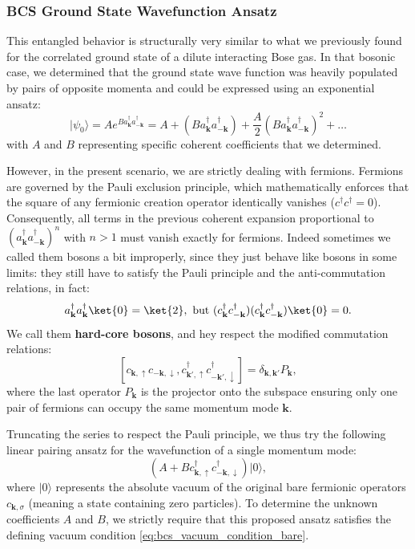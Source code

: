 \subsubsection{BCS Ground State Wavefunction Ansatz}

This entangled behavior is structurally very similar to what we previously found for the correlated ground state of a dilute interacting Bose gas. In that bosonic case, we determined that the ground state wave function was heavily populated by pairs of opposite momenta and could be expressed using an exponential ansatz:
\[
    |\psi_0\rangle = A e^{B a_{\mathbf{k}}^\dagger a_{-\mathbf{k}}^\dagger} = A + \left(B a_{\mathbf{k}}^\dagger a_{-\mathbf{k}}^\dagger\right) + \frac{A}{2} \left(B a_{\mathbf{k}}^\dagger a_{-\mathbf{k}}^\dagger\right)^2 + \dots
\]
with \( A \) and \( B \) representing specific coherent coefficients that we determined.

However, in the present scenario, we are strictly dealing with fermions. Fermions are governed by the Pauli exclusion principle, which mathematically enforces that the square of any fermionic creation operator identically vanishes (\( c^\dagger c^\dagger = 0 \)). Consequently, all terms in the previous coherent expansion proportional to \( \left(a_{\mathbf{k}}^\dagger a_{-\mathbf{k}}^\dagger\right)^n \) with \( n > 1 \) must vanish exactly for fermions. Indeed sometimes we called them bosons a bit improperly, since they just behave like bosons in some limits: they still have to satisfy the Pauli principle and the anti-commutation relations, in fact:
\[
    a^\dagger_{\mathbf{k}} a^\dagger_{\mathbf{k}} \ket{0} = \ket{2}, \text{ but } (c^\dagger_{\mathbf{k}} c^\dagger_{-\mathbf{k}})(c^\dagger_{\mathbf{k}} c^\dagger_{-\mathbf{k}}) \ket{0} = 0.
\]
We call them \textbf{hard-core bosons}, and hey respect the modified commutation relations:
\[
    [c_{\mathbf{k},\uparrow}c_{-\mathbf{k},\downarrow}, c_{\mathbf{k}',\uparrow}^\dagger c_{-\mathbf{k}',\downarrow}^\dagger] = \delta_{\mathbf{k},\mathbf{k}'} P_{\mathbf{k}},
\]
where the last operator \( P_{\mathbf{k}} \) is the projector onto the subspace ensuring only one pair of fermions can occupy the same momentum mode \( \mathbf{k} \).

Truncating the series to respect the Pauli principle, we thus try the following linear pairing ansatz for the wavefunction of a single momentum mode:
\[
    \left( A + B c_{\mathbf{k},\uparrow}^\dagger c_{-\mathbf{k},\downarrow}^\dagger \right) |0\rangle,
\]
where \( |0\rangle \) represents the absolute vacuum of the original bare fermionic operators \( c_{\mathbf{k},\sigma} \) (meaning a state containing zero particles). To determine the unknown coefficients \( A \) and \( B \), we strictly require that this proposed ansatz satisfies the defining vacuum condition \eqref{eq:bcs_vacuum_condition_bare}.

